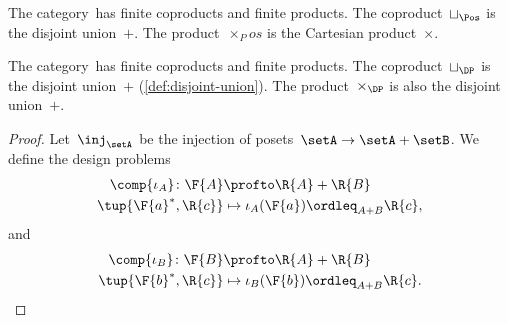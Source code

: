 \begin{example}
	The category~\Pos has finite coproducts and finite products.
	The coproduct~$\sqcup_\Pos$ is the disjoint union~$+$.
	The product~$\times_Pos$ is the Cartesian product~$\times$.
\end{example}

\begin{lemma}
	The category~\DP has finite coproducts and finite products.
	The coproduct~$\sqcup_\DP$ is the disjoint union~$+$ (\cref{def:disjoint-union}).
	The product~$\times_\DP$ is also the disjoint union~$+$.
\end{lemma}

\begin{proof}
	Let~$\inj_\setA$ be the injection of posets~$\setA \to \setA+\setB$.
	We define the design problems
	\begin{equation}
		\begin{aligned}
			\comp{\iota_A} \colon \F{A} & \profto \R{A} + \R{B}                     \\
			\tup{\F{a}^*,\R{c}}         & \mapsto \iota_A(\F{a})\ordleq_{A+B}\R{c},
		\end{aligned}
	\end{equation}
	and
	\begin{equation}
		\begin{aligned}
			\comp{\iota_B} \colon \F{B} & \profto \R{A} + \R{B}                     \\
			\tup{\F{b}^*,\R{c}}         & \mapsto \iota_B(\F{b})\ordleq_{A+B}\R{c}.
		\end{aligned}
	\end{equation}


\end{proof}
